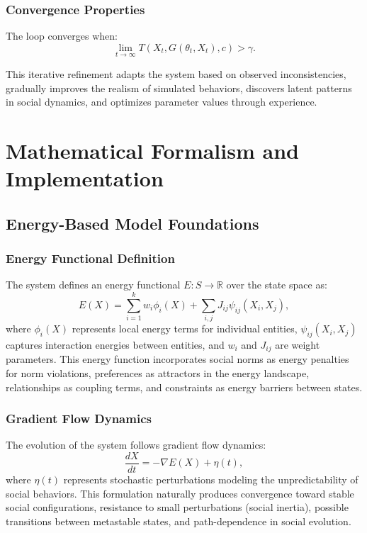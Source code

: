 \documentclass[11pt,a4paper]{article}
\begin{document}
\subsubsection{Convergence Properties}

The loop converges when:
\begin{equation}
\lim_{t \to \infty} T(X_t, G(\theta_t, X_t), c) > \gamma.
\end{equation}

This iterative refinement adapts the system based on observed inconsistencies, gradually improves the realism of simulated behaviors, discovers latent patterns in social dynamics, and optimizes parameter values through experience.

\section{Mathematical Formalism and Implementation}

\subsection{Energy-Based Model Foundations}

\subsubsection{Energy Functional Definition}

The system defines an energy functional $E : S \to \mathbb{R}$ over the state space as:
\begin{equation}
E(X) = \sum_{i=1}^k w_i \phi_i(X) + \sum_{i,j} J_{ij} \psi_{ij}(X_i, X_j),
\end{equation}
where $\phi_i(X)$ represents local energy terms for individual entities, $\psi_{ij}(X_i, X_j)$ captures interaction energies between entities, and $w_i$ and $J_{ij}$ are weight parameters. This energy function incorporates social norms as energy penalties for norm violations, preferences as attractors in the energy landscape, relationships as coupling terms, and constraints as energy barriers between states.

\subsubsection{Gradient Flow Dynamics}

The evolution of the system follows gradient flow dynamics:
\begin{equation}
\frac{dX}{dt} = -\nabla E(X) + \eta(t),
\end{equation}
where $\eta(t)$ represents stochastic perturbations modeling the unpredictability of social behaviors. This formulation naturally produces convergence toward stable social configurations, resistance to small perturbations (social inertia), possible transitions between metastable states, and path-dependence in social evolution.
\end{document}
